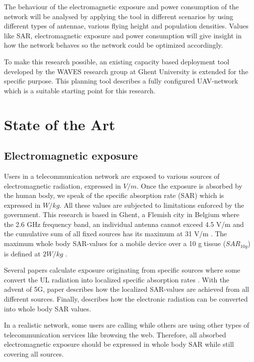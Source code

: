\documentclass[twocolumn]{phdsymp} %
\begin{document}
The behaviour of the electromagnetic exposure and power consumption of the network will be analysed
 by applying the tool in different scenarios by using different types of antennae, various flying height and population 
densities.
Values like \gls{SAR}, electromagnetic exposure and power consumption will 
 give insight in how the network behaves so the network could be optimized accordingly.

To make this research possible, 
an existing capacity based deployment tool developed by the WAVES research group at Ghent University is extended for the specific purpose.
This planning tool describes a fully configured \gls{UAV}-network which is a suitable starting point for this research.


\section{State of the Art}
\subsection{Electromagnetic exposure}

Users in a telecommunication network are exposed to various sources of electromagnetic radiation, expressed in $V/m$. Once the exposure is absorbed by the human 
body, we speak of the specific absorption rate (SAR) which is expressed in $W/kg$. All these values are 
subjected to limitations enforced by the government. This research is based in Ghent, 
a Flemish city in Belgium where the 2.6 GHz frequency band, an individual antenna cannot exceed 4.5 V/m and the cumulative sum of all 
fixed sources has its maximum at 31 V/m \cite{J23,S13_normenBelgie}. The maximum whole body SAR-values for a mobile device 
over a 10 g tissue ($SAR_{10g}$) is defined at $2 W/kg$ \cite{J30}. 

Several papers calculate exposure originating from specific sources  \cite{J6_originalExposureFormula,J1,J10_RDP,J10.1} 
where some convert the \gls{UL} radiation into localized specific absorption rates \cite{J10_RDP,J10.1}. 
With the advent of 5G, paper \cite{J17_kuehn2019modelling} describes 
how the localized \gls{SAR}-values are achieved from all different sources.
Finally, \cite{J22_plets2015joint} describes how the electronic radiation can be converted into whole body SAR values.

In a realistic network, some users are calling while others are using other types of telecommunication services like browsing the web.
Therefore, all absorbed electromagnetic exposure should be expressed in whole body SAR while still covering all sources.
\end{document}
